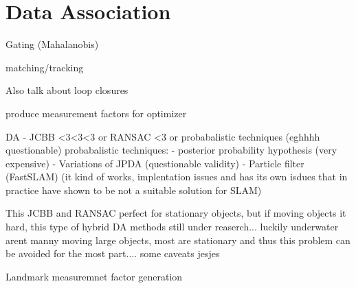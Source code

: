 \section{Data Association}


Gating (Mahalanobis)

matching/tracking

Also talk about loop closures

produce measurement factors for optimizer

DA - JCBB <3<3<3 or RANSAC <3 or probabalistic techniques (eghhhh questionable)
probabalistic techniques:
  - posterior probability hypothesis (very expensive) 
  - Variations of JPDA (questionable validity)
  - Particle filter (FastSLAM) (it kind of works, implentation issues and has its own isdues that in practice have shown to be not a suitable solution for SLAM)

This JCBB and RANSAC perfect for stationary objects, but if moving objects it hard, this type of hybrid DA methods still under reaserch... luckily underwater arent manny moving large objects, most are stationary and thus this problem can be avoided for the most part.... some caveats jesjes

Landmark measuremnet factor generation